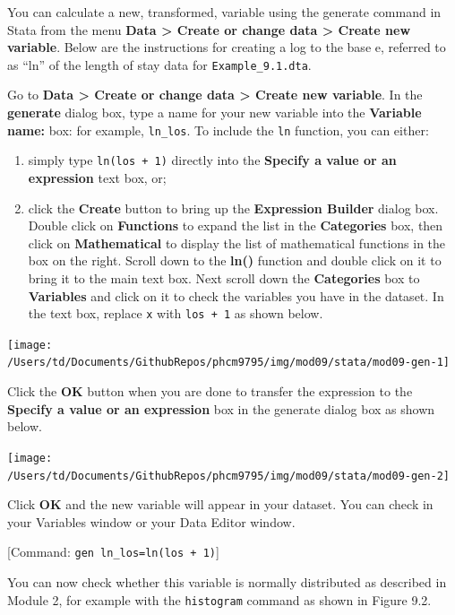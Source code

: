 \documentclass[
]{memoir}
\providecommand{\tightlist}{%
  \setlength{\itemsep}{0pt}\setlength{\parskip}{0pt}}
\begin{document}
You can calculate a new, transformed, variable using the generate command in Stata from the menu \textbf{Data \textgreater{} Create or change data \textgreater{} Create new variable}. Below are the instructions for creating a log to the base e, referred to as ``ln'' of the length of stay data for \texttt{Example\_9.1.dta}.

Go to \textbf{Data \textgreater{} Create or change data \textgreater{} Create new variable}. In the \textbf{generate} dialog box, type a name for your new variable into the \textbf{Variable name:} box: for example, \texttt{ln\_los}. To include the \texttt{ln} function, you can either:

\begin{enumerate}
\def\labelenumi{\arabic{enumi})}
\tightlist
\item
  simply type \texttt{ln(los\ +\ 1)} directly into the \textbf{Specify a value or an expression} text box, or;
\item
  click the \textbf{Create} button to bring up the \textbf{Expression Builder} dialog box. Double click on \textbf{Functions} to expand the list in the \textbf{Categories} box, then click on \textbf{Mathematical} to display the list of mathematical functions in the box on the right. Scroll down to the \textbf{ln()} function and double click on it to bring it to the main text box. Next scroll down the \textbf{Categories} box to \textbf{Variables} and click on it to check the variables you have in the dataset. In the text box, replace \texttt{x} with \texttt{los\ +\ 1} as shown below.
\end{enumerate}

\texttt{[image: /Users/td/Documents/GithubRepos/phcm9795/img/mod09/stata/mod09-gen-1]}

Click the \textbf{OK} button when you are done to transfer the expression to the \textbf{Specify a value or an expression} box in the generate dialog box as shown below.

\texttt{[image: /Users/td/Documents/GithubRepos/phcm9795/img/mod09/stata/mod09-gen-2]}

Click \textbf{OK} and the new variable will appear in your dataset. You can check in your Variables window or your Data Editor window.

{[}Command: \texttt{gen\ ln\_los=ln(los\ +\ 1)}{]}

You can now check whether this variable is normally distributed as described in Module 2, for example with the \texttt{histogram} command as shown in Figure 9.2.
\end{document}
